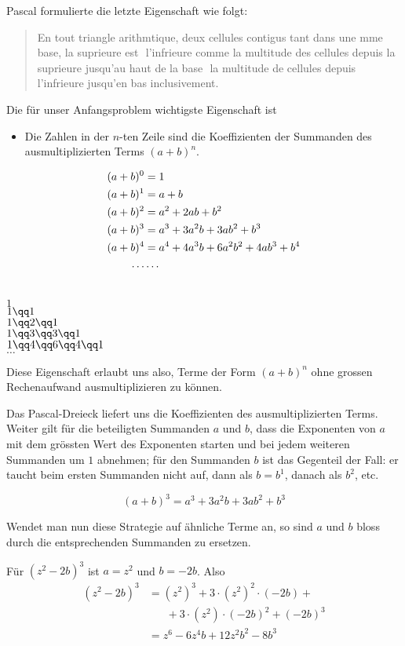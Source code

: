 \documentclass[
twoside,%
ngerman,%
headsepline%
11pt]%
{article}
\begin{document}
\noindent Pascal formulierte die letzte Eigenschaft wie folgt:
\begin{quote}
  \glqq En tout triangle arithmtique, deux cellules contigus tant dans
  une mme base, la suprieure est  l'infrieure comme la multitude
  des cellules depuis la suprieure jusqu'au haut de la base  la
  multitude de cellules depuis l'infrieure jusqu'en bas
  inclusivement.\grqq
\end{quote}

Die f\"ur unser Anfangsproblem wichtigste Eigenschaft ist

\begin{itemize}
\item Die Zahlen in der $n$-ten Zeile sind die Koeffizienten der Summanden des ausmultiplizierten Terms $(a+b)^n$.
\end{itemize}

  \begin{align}
    (a+b)^0 &= 1\notag\\
    (a+b)^1 &= a+b\notag\\
    (a+b)^2 &= a^2+2ab+b^2\notag\\
    (a+b)^3 &= a^3+3a^2b+3ab^2+b^3\notag\\
    (a+b)^4 &= a^4+4a^3b+6a^2b^2+4ab^3+b^4\notag\\
    \dots &\dots\notag
  \end{align}

  \begin{center}
    \ \\[2pt]
    $1$\\[6pt]
    $1\qq1$\\[6pt]
    $1\qq2\qq1$\\[6pt]
    $1\qq3\qq3\qq1$\\[6pt]
    $1\qq4\qq6\qq4\qq1$\\[6pt]
    $\dots$
  \end{center}

Diese Eigenschaft erlaubt uns also, Terme der Form $(a+b)^n$ ohne grossen Rechenaufwand ausmultiplizieren zu k\"onnen.
\begin{bem}
Das Pascal-Dreieck liefert uns die Koeffizienten des ausmultiplizierten Terms. Weiter gilt f\"ur die beteiligten Summanden $a$ und $b$, dass die Exponenten von $a$ mit dem gr\"ossten Wert des Exponenten starten und bei jedem weiteren Summanden um $1$ abnehmen; f\"ur den Summanden $b$ ist das Gegenteil der Fall: er taucht beim ersten Summanden nicht auf, dann als $b=b^1$, danach als $b^2$, etc.
\end{bem}
\begin{bsp}
$$(a+b)^3=a^3+3a^2b+3ab^2+b^3$$
\end{bsp}
Wendet man nun diese Strategie auf \"ahnliche Terme an, so sind $a$ und $b$ bloss durch die entsprechenden Summanden zu ersetzen.
\begin{bsp}
F\"ur $(z^2-2b)^3$ ist $a=z^2$ und $b=-2b$. Also
\begin{align*}
(z^2-2b)^3&=(z^2)^3+3\cdot(z^2)^2\cdot(-2b)+\\
&\phantom{=\;}+3\cdot(z^2)\cdot(-2b)^2+(-2b)^3\\
&=z^6-6z^4b+12z^2b^2-8b^3
\end{align*}
\end{bsp}
\end{document}
